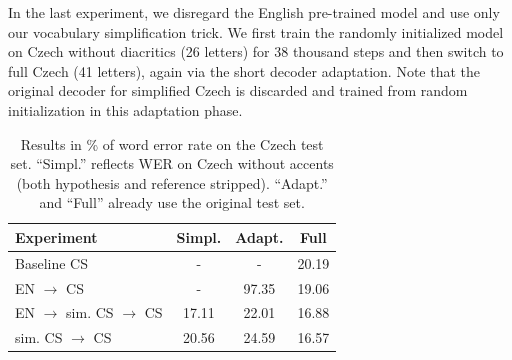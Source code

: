 


In the last experiment, we disregard the English pre-trained model and use only our vocabulary simplification trick. We first train the randomly initialized model on Czech without diacritics (26 letters) for 38 thousand steps and then switch to full Czech  (41 letters), again via the short decoder adaptation. Note that the original decoder for simplified Czech is discarded and trained from random initialization in this adaptation phase.



\begin{table}[t]
\small\centering
\begin{tabular}{lc|cc}
\bf Experiment & \bf Simpl. & \bf Adapt. & \bf Full \\
\hline
 Baseline CS & - &  - &  20.19 \\
 EN $\rightarrow$ CS & -  & 97.35 &  19.06  \\
 EN $\rightarrow$ sim. CS $\rightarrow$ CS & 17.11  & 22.01 &  16.88 \\
 sim. CS $\rightarrow$ CS & 20.56  &  24.59 &  16.57  \\
\end{tabular}
\caption{Results in \% of word error rate on the Czech test set. ``Simpl.'' reflects WER on Czech without accents (both hypothesis and reference stripped). ``Adapt.'' and ``Full'' already use the original test set.}
\label{tab:results}
\end{table}



